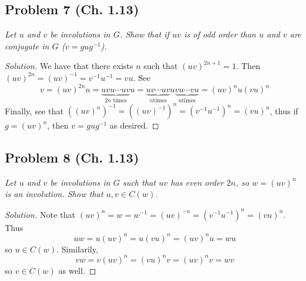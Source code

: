\documentclass{article}
\begin{document}
\subsection*{Problem 7 (Ch. 1.13)}
{\it Let $u$ and $v$ be involutions in $G$.
Show that if $uv$ is of odd order than $u$ and $v$
are conjugate in $G$ ($v = gug^{-1}$).}
\begin{proof}[Solution]\let\qed\relax
	We have that there exists $n$ such that $(uv)^{2n+1} = 1$.
	Then $(uv)^{2n} = (uv)^{-1} = v^{-1}u^{-1} = vu$.
	See
	\[
		v = (uv)^{2n}u = \underbrace{uvu \cdots uv}_{2n\text{ times}}u
		= \underbrace{uv\cdots uv}_{n\text{times}}u\underbrace{vu\cdots vu}_{n\text{times}}
		= (uv)^n u (vu)^n
	\]
	Finally, see that $((uv)^n)^{-1} = ((uv)^{-1})^n = (v^{-1}u^{-1})^n = (vu)^n$,
	thus if $g = (uv)^n$, then $v = gug^{-1}$ as desired.
\end{proof}

\subsection*{Problem 8 (Ch. 1.13)}
{\it Let $u$ and $v$ be involutions in $G$ such that $uv$ has even order $2n$,
so $w = (uv)^n$ is an involution.
Show that $u,v \in C(w)$.}
\begin{proof}[Solution]\let\qed\relax
	Note that $(uv)^n = w = w^{-1} = (uv)^{-n} = (v^{-1}u^{-1})^n = (vu)^n$.
	Thus
	\[
		uw = u(uv)^n = u(vu)^n = (uv)^nu = wu
	\]
	so $u \in C(w)$.
	Similarily,
	\[
		vw = v(uv)^n = (vu)^nv = (uv)^nv = wv
	\]
	so $v \in C(w)$ as well.
\end{proof}
\end{document}
